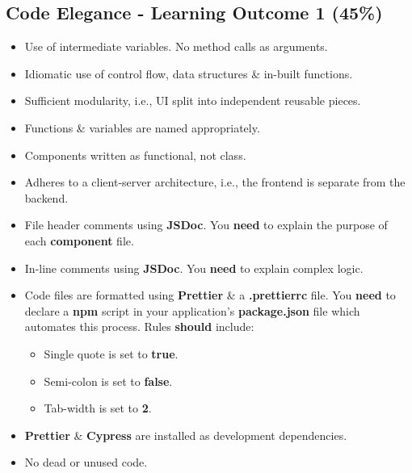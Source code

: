 \documentclass{article}
\begin{document}
\subsection*{Code Elegance - Learning Outcome 1 (45\%)}
\begin{itemize}
    \item Use of intermediate variables. No method calls as arguments.
    \item Idiomatic use of control flow, data structures \& in-built functions.
	\item Sufficient modularity, i.e., UI split into independent reusable pieces.
	\item Functions \& variables are named appropriately.
	\item Components written as functional, not class.
	\item Adheres to a client-server architecture, i.e., the frontend is separate from the backend.
	\item File header comments using \textbf{JSDoc}. You \textbf{need} to explain the purpose of each \textbf{component} file.
	\item In-line comments using \textbf{JSDoc}. You \textbf{need} to explain complex logic.
	\item Code files are formatted using \textbf{Prettier} \& a \textbf{.prettierrc} file. You \textbf{need} to declare a \textbf{npm} script in your application's \textbf{package.json} file which automates this process. Rules \textbf{should} include:
	      \begin{itemize}
	      	\item Single quote is set to \textbf{true}.
	      	\item Semi-colon is set to \textbf{false}.
	      	\item Tab-width is set to \textbf{2}.
	      \end{itemize}
	\item \textbf{Prettier} \& \textbf{Cypress} are installed as development dependencies.
	\item No dead or unused code.
\end{itemize}
\end{document}
